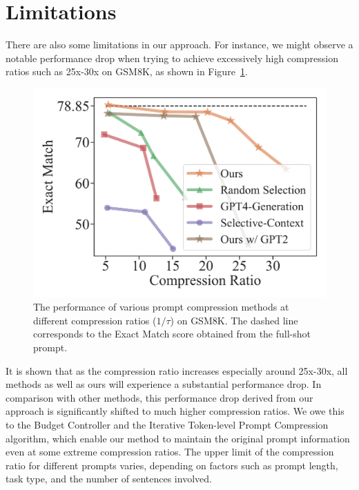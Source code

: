 \section*{Limitations}

There are also some limitations in our approach.
For instance, we might observe a notable performance drop when trying to achieve excessively high compression ratios such as 25x-30x on GSM8K, 
as shown in Figure~\ref{fig:big_compression_atio}.
\begin{figure}[htb]
    \centering
    \includegraphics[width=\linewidth]{figures/compression_ratio_performance_gsm8k.pdf}
    \caption{The performance of various prompt compression methods at different compression ratios ($1/\tau$) on GSM8K. The dashed line corresponds to the Exact Match score obtained from the full-shot prompt.}
    \label{fig:big_compression_atio}
\end{figure}

It is shown that
as the compression ratio increases especially around 25x-30x, all methods as well as ours will experience a substantial performance drop.
In comparison with other methods, this performance drop derived from our approach is significantly shifted to much higher compression ratios. 
We owe this to the Budget Controller and the Iterative Token-level Prompt Compression algorithm, which enable our method to maintain the original prompt information even at some extreme compression ratios.
The upper limit of the compression ratio for different prompts varies, depending on factors such as prompt length, task type, and the number of sentences involved.

